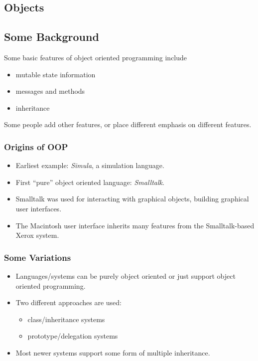 \begin{slide}{}
\chapter{Objects}
\end{slide}

\begin{slide}{}
\section{Some Background}
Some basic features of object oriented programming include
\begin{itemize}
\item mutable state information
\item messages and methods
\item inheritance
\end{itemize}
Some people add other features, or place different emphasis on
different features.
\end{slide}

\begin{slide}{}
\subsection{Origins of OOP}
\begin{itemize}
\item
Earliest example: {\em Simula}, a simulation language.
\item
First ``pure'' object oriented language: {\em Smalltalk}.
\item
Smalltalk was used for interacting with graphical objects, building
graphical user interfaces.
\item
The Macintosh user interface inherits many features from the
Smalltalk-based Xerox system.
\end{itemize}
\end{slide}

\begin{slide}{}
\subsection{Some Variations}
\begin{itemize}
\item
Languages/systems can be purely object oriented or just support object
oriented programming.
\item
Two different approaches are used:
\begin{itemize}
\item class/inheritance systems
\item prototype/delegation systems
\end{itemize}
\item
Most newer systems support some form of multiple inheritance.
\end{itemize}
\end{slide}

